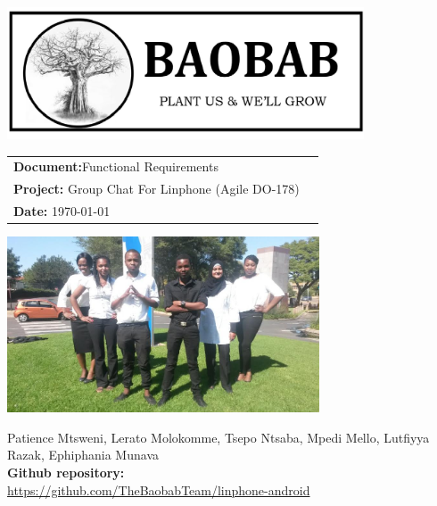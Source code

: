 
\begin{titlepage}

\begin{center}

\includegraphics[width=400px]{pictures/logo.jpg}
\vspace{1 cm}
\begin{flushright} \large
\begin{tabular}{lr}
\vspace{1 cm}
\LARGE\textbf{Document:}Functional Requirements\\
\vspace{1 cm}
\LARGE\textbf{Project:} Group Chat For Linphone (Agile DO-178)\\
\LARGE\textbf{Date: }\today\\
\end{tabular}
\end{flushright}

\centering \includegraphics[width=350px]{pictures/Team.jpg}

Patience Mtsweni, Lerato Molokomme, Tsepo Ntsaba, Mpedi Mello, Lutfiyya Razak, Ephiphania Munava\\
\vspace{1 cm}
\large\textbf{Github repository: } \\
\url{https://github.com/TheBaobabTeam/linphone-android}

\end{center}
\end{titlepage}